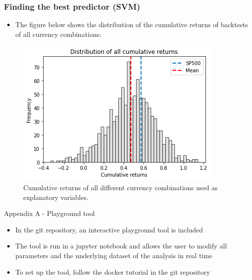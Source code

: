 \documentclass{beamer}
\begin{document}
\begin{frame}
\frametitle{Finding the best predictor (SVM)}
\begin{itemize}
    \item The figure below shows the distribution of the cumulative returns of backtests of all currency combinations:
\end{itemize}
\begin{figure}[h!]
\begin{center}
  \includegraphics[width=0.55\columnwidth]{images/hist_comparison.png}
  \caption{Cumulative returns of all different currency combinations used as explanatory variables.}
\end{center}
  \label{fig: cumulative returns}
\end{figure}

\end{frame}


\appendix

\begin{frame}{Appendix A - Playground tool}
  \begin{itemize}
  \item In the git repository, an interactive playground tool is included
  \item The tool is run in a jupyter notebook and allows the user to modify all parameters and the underlying dataset of the analysis in real time
  \item To set up the tool, follow the docker tutorial in the git repository
  \end{itemize}
\end{frame}

    
\end{document}
